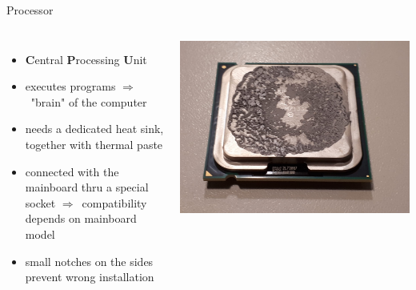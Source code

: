 \documentclass[10pt, graphics, aspectratio=169, table]{beamer}
\newcommand{\ra}{$\Rightarrow$\ }
\begin{document}
    \begin{frame}{Processor}
        \begin{columns}
                \begin{itemize}
                	\item \textbf{C}entral \textbf{P}rocessing \textbf{U}nit
                    \item executes programs \ra "brain" of the computer
                    \item needs a dedicated heat sink, together with thermal paste
                    \item connected with the mainboard thru a special socket \ra compatibility depends on mainboard model
                    \item small notches on the sides prevent wrong installation
                \end{itemize}
                \center\includegraphics[scale=0.1]{img/cpu.jpeg}
        \end{columns}
    \end{frame}
\end{document}
